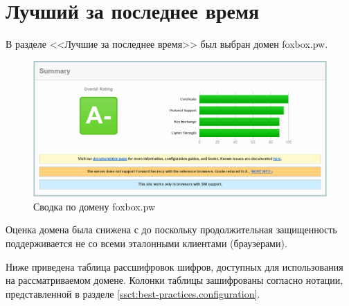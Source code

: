 \section{Лучший за последнее время}

В разделе <<Лучшие за последнее время>> был выбран домен foxbox.pw. 

\begin{figure}[H]
    \centering
    \includegraphics[width=\textwidth]{resources/01_summary.png}
    \caption{Сводка по домену foxbox.pw}
    \label{fig:01-summary}
\end{figure}

Оценка домена была снижена с  до  поскольку продолжительная защищенность поддерживается не со всеми эталонными 
клиентами (браузерами).

Ниже приведена таблица рассшифровок шифров, доступных для использования на рассматриваемом домене. Колонки таблицы зашифрованы 
согласно нотации, представленной в разделе \ref{ssct:best-practices.configuration}.

